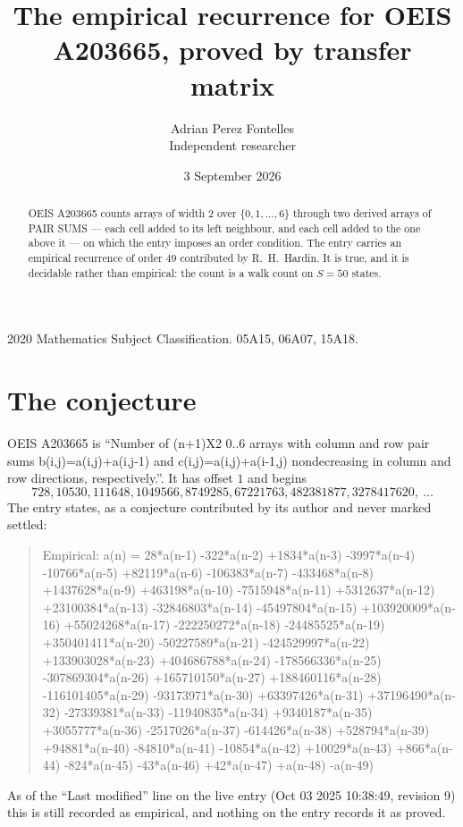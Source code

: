 \documentclass[11pt,a4paper]{article}
\title{The empirical recurrence for OEIS A203665, proved by transfer matrix}
\author{Adrian Perez Fontelles\\ \small Independent researcher}
\date{3 September 2026}
\theoremstyle{plain}
\theoremstyle{definition}
\begin{document}
\maketitle

\begin{abstract}
OEIS A203665 counts arrays of width $2$ over $\{0,1,\dots,6\}$ through two derived arrays of PAIR SUMS ---
each cell added to its left neighbour, and each cell added to the one above it --- on which the
entry imposes an order condition. The entry carries an empirical recurrence of order $49$
contributed by R.~H.~Hardin. It is true, and it is decidable rather than empirical: the count is
a walk count on $S=50$ states.
\end{abstract}

\noindent\small 2020 Mathematics Subject Classification. 05A15, 06A07, 15A18.\normalsize

\section{The conjecture}

OEIS A203665 is ``Number of (n+1)X2 0..6 arrays with column and row pair sums b(i,j)=a(i,j)+a(i,j-1) and c(i,j)=a(i,j)+a(i-1,j) nondecreasing in column and row directions, respectively.''. It has offset $1$ and begins
\[
728, 10530, 111648, 1049566, 8749285, 67221763, 482381877, 3278417620,\ \dots
\]
The entry states, as a conjecture contributed by its author and never marked settled:
\begin{quote}
Empirical: a(n) = 28*a(n-1) -322*a(n-2) +1834*a(n-3) -3997*a(n-4) -10766*a(n-5) +82119*a(n-6) -106383*a(n-7) -433468*a(n-8) +1437628*a(n-9) +463198*a(n-10) -7515948*a(n-11) +5312637*a(n-12) +23100384*a(n-13) -32846803*a(n-14) -45497804*a(n-15) +103920009*a(n-16) +55024268*a(n-17) -222250272*a(n-18) -24485525*a(n-19) +350401411*a(n-20) -50227589*a(n-21) -424529997*a(n-22) +133903028*a(n-23) +404686788*a(n-24) -178566336*a(n-25) -307869304*a(n-26) +165710150*a(n-27) +188460116*a(n-28) -116101405*a(n-29) -93173971*a(n-30) +63397426*a(n-31) +37196490*a(n-32) -27339381*a(n-33) -11940835*a(n-34) +9340187*a(n-35) +3055777*a(n-36) -2517026*a(n-37) -614426*a(n-38) +528794*a(n-39) +94881*a(n-40) -84810*a(n-41) -10854*a(n-42) +10029*a(n-43) +866*a(n-44) -824*a(n-45) -43*a(n-46) +42*a(n-47) +a(n-48) -a(n-49)
\end{quote}
As of the ``Last modified'' line on the live entry (Oct 03 2025 10:38:49, revision 9) this is still
recorded as empirical, and nothing on the entry records it as proved.
\end{document}
